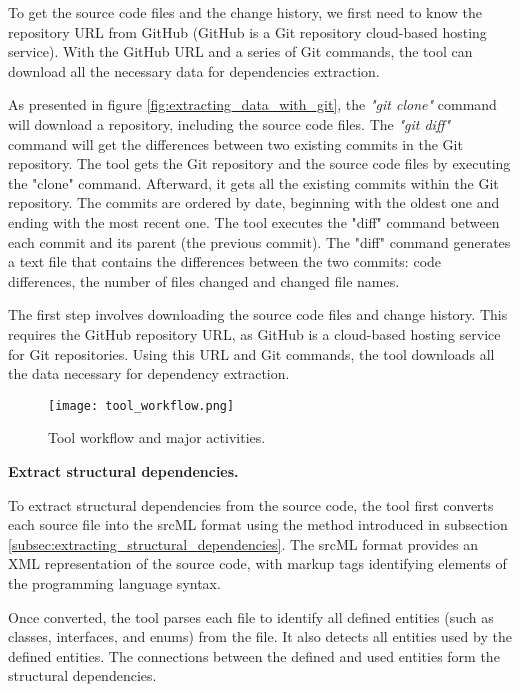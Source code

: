 To get the source code files and the change history, we first need to know the repository URL from GitHub (GitHub is a Git repository cloud-based hosting service). With the GitHub URL and a series of Git commands, the tool can download all the necessary data for dependencies extraction.


As presented in figure \ref{fig:extracting_data_with_git}, the \textit{"git clone"} command will download a repository, including the source code files. The \textit{"git diff"} command will get the differences between two existing commits in the Git repository. 
The tool gets the Git repository and the source code files by executing the "clone" command. Afterward, it gets all the existing commits within the Git repository. The commits are ordered by date, beginning with the oldest one and ending with the most recent one. The tool executes the "diff" command between each commit and its parent (the previous commit). The "diff" command generates a text file that contains the differences between the two commits: code differences, the number of files changed and changed file names.


The first step involves downloading the source code files and change history. This requires the GitHub repository URL, as GitHub is a cloud-based hosting service for Git repositories. Using this URL and Git commands, the tool downloads all the data necessary for dependency extraction.

\begin{figure}[H]
\centering
\texttt{[image: tool\_workflow.png]}
\caption{Tool workflow and major activities.}
\label{fig:figworkflow}
\end{figure}



\textbf{Extract structural dependencies.}

To extract structural dependencies from the source code, the tool first converts each source file into the srcML format using the method introduced in subsection \ref{subsec:extracting_structural_dependencies}. The srcML format provides an XML representation of the source code, with markup tags identifying elements of the programming language syntax\cite{srcML}. 

Once converted, the tool parses each file to identify all defined entities (such as classes, interfaces, and enums) from the file. It also detects all entities used by the defined entities. The connections between the defined and used entities form the structural dependencies.



